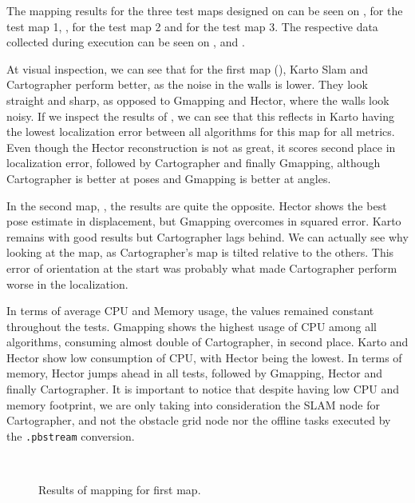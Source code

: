 The mapping results for the three test maps designed on  can be seen on , for the test map 1, , for the test map 2 and  for the test map 3. The respective data collected during execution can be seen on ,  and .

At visual inspection, we can see that for the first map (), Karto Slam and Cartographer perform better, as the noise in the walls is lower. They look straight and sharp, as opposed to Gmapping and Hector, where the walls look noisy. If we inspect the results of , we can see that this reflects in Karto having the lowest localization error between all algorithms for this map for all metrics. Even though the Hector reconstruction is not as great, it scores second place in localization error, followed by Cartographer and finally Gmapping, although Cartographer is better at poses and Gmapping is better at angles.

In the second map, , the results are quite the opposite. Hector shows the best pose estimate in displacement, but Gmapping overcomes in squared error. Karto remains with good results but Cartographer lags behind. We can actually see why looking at the map, as Cartographer's map is tilted relative to the others. This error of orientation at the start was probably what made Cartographer perform worse in the localization.

In terms of average CPU and Memory usage, the values remained constant throughout the tests. Gmapping shows the highest usage of CPU among all algorithms, consuming almost double of Cartographer, in second place. Karto and Hector show low consumption of CPU, with Hector being the lowest. In terms of memory, Hector jumps ahead in all tests, followed by Gmapping, Hector and finally Cartographer. It is important to notice that despite having low CPU and memory footprint, we are only taking into consideration the SLAM node for Cartographer, and not the obstacle grid node nor the offline tasks executed by the \texttt{.pbstream} conversion.

\newpage
\begin{figure}[!ht]
     \centering
     \hspace{1cm}
     \\
     \hspace{1cm}
     \caption{Results of mapping for first map.}
     \label{fig:results1}
\end{figure}

